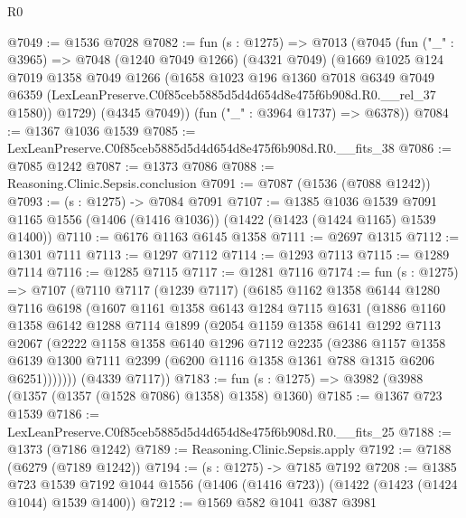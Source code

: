 \begin{lexlean}{R0}
\begin{coremodule}
@7049 := @1536 @7028
@7082 := fun (s : @1275) =>
  @7013
    (@7045
      (fun ("_" : @3965) =>
      @7048
        (@1240 @7049 @1266)
        (@4321 @7049)
        (@1669
          @1025
          @124
          @7019
          @1358
          @7049
          @1266
          (@1658
            @1023
            @196
            @1360
            @7018
            @6349
            @7049
            @6359
            (LexLeanPreserve.C0f85ceb5885d5d4d654d8e475f6b908d.R0.__rel_37 @1580))
          @1729)
        (@4345 @7049))
      (fun ("_" : @3964 @1737) => @6378))
@7084 := @1367 @1036 @1539
@7085 := LexLeanPreserve.C0f85ceb5885d5d4d654d8e475f6b908d.R0.__fits_38
@7086 := @7085 @1242
@7087 := @1373 @7086
@7088 := Reasoning.Clinic.Sepsis.conclusion
@7091 := @7087 (@1536 (@7088 @1242))
@7093 := (s : @1275) -> @7084 @7091
@7107 := @1385
    @1036
    @1539
    @7091
    @1165
    @1556
    (@1406 (@1416 @1036))
    (@1422 (@1423 (@1424 @1165) @1539 @1400))
@7110 := @6176 @1163 @6145 @1358
@7111 := @2697 @1315
@7112 := @1301 @7111
@7113 := @1297 @7112
@7114 := @1293 @7113
@7115 := @1289 @7114
@7116 := @1285 @7115
@7117 := @1281 @7116
@7174 := fun (s : @1275) =>
  @7107
    (@7110
      @7117
      (@1239 @7117)
      (@6185
        @1162
        @1358
        @6144
        @1280
        @7116
        @6198
        (@1607
          @1161
          @1358
          @6143
          @1284
          @7115
          @1631
          (@1886
            @1160
            @1358
            @6142
            @1288
            @7114
            @1899
            (@2054
              @1159
              @1358
              @6141
              @1292
              @7113
              @2067
              (@2222
                @1158
                @1358
                @6140
                @1296
                @7112
                @2235
                (@2386
                  @1157
                  @1358
                  @6139
                  @1300
                  @7111
                  @2399
                  (@6200 @1116 @1358 @1361 @788 @1315 @6206 @6251)))))))
      (@4339 @7117))
@7183 := fun (s : @1275) => @3982 (@3988 (@1357 (@1357 (@1528 @7086) @1358) @1358) @1360)
@7185 := @1367 @723 @1539
@7186 := LexLeanPreserve.C0f85ceb5885d5d4d654d8e475f6b908d.R0.__fits_25
@7188 := @1373 (@7186 @1242)
@7189 := Reasoning.Clinic.Sepsis.apply
@7192 := @7188 (@6279 (@7189 @1242))
@7194 := (s : @1275) -> @7185 @7192
@7208 := @1385
    @723
    @1539
    @7192
    @1044
    @1556
    (@1406 (@1416 @723))
    (@1422 (@1423 (@1424 @1044) @1539 @1400))
@7212 := @1569 @582 @1041 @387 @3981

\end{coremodule}
\end{lexlean}
